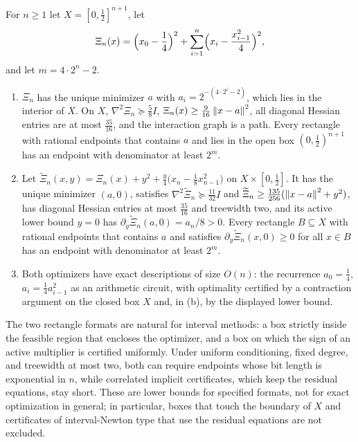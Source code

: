 \begin{proposition}\label{prop:points-rectangle}
For $n\ge1$ let $X=[0,\frac12]^{n+1}$, let
\[
 \Xi_n(x)=\Bigl(x_0-\frac14\Bigr)^2+\sum_{i=1}^n\Bigl(x_i-\frac{x_{i-1}^2}4\Bigr)^2,
\]
and let $m=4\cdot2^n-2$.
\begin{enumerate}[label=(\alph*)]
\item $\Xi_n$ has the unique minimizer $a$ with $a_i=2^{-(4\cdot2^i-2)}$,
which lies in the interior of $X$. On $X$, $\nabla^2\Xi_n\succeq\frac58I$,
$\Xi_n(x)\ge\frac9{16}\left\lVert x-a\right\rVert^2$, all diagonal Hessian entries are at most
$\frac{35}{16}$, and the interaction graph is a path. Every rectangle with
rational endpoints that contains $a$ and lies in the open box
$(0,\frac12)^{n+1}$ has an endpoint with denominator at least $2^m$.
\item Let
$\widetilde\Xi_n(x,y)=\Xi_n(x)+y^2+\frac y4\bigl(x_n-\frac18x_{n-1}^2\bigr)$
on $X\times[0,\frac12]$. It has the unique minimizer $(a,0)$, satisfies
$\nabla^2\widetilde\Xi_n\succeq\frac{11}{32}I$ and
$\widetilde\Xi_n\ge\frac{135}{256}(\left\lVert x-a\right\rVert^2+y^2)$, has diagonal Hessian
entries at most $\frac{35}{16}$ and treewidth two, and its active lower bound
$y=0$ has $\partial_y\widetilde\Xi_n(a,0)=a_n/8>0$. Every rectangle
$B\subseteq X$ with rational endpoints that contains $a$ and satisfies
$\partial_y\widetilde\Xi_n(x,0)\ge0$ for all $x\in B$ has an endpoint with
denominator at least $2^m$.
\item Both optimizers have exact descriptions of size $O(n)$: the
recurrence $a_0=\frac14$, $a_i=\frac14a_{i-1}^2$ as an arithmetic circuit,
with optimality certified by a contraction argument on the closed box $X$
and, in (b), by the displayed lower bound.
\end{enumerate}
\end{proposition}

The two rectangle formats are natural for interval methods: a box strictly
inside the feasible region that encloses the optimizer, and a box on which
the sign of an active multiplier is certified uniformly. Under uniform
conditioning, fixed degree, and treewidth at most two, both can require
endpoints whose bit length is exponential in $n$, while correlated implicit
certificates, which keep the residual equations, stay short. These are lower
bounds for specified formats, not for exact optimization in general; in
particular, boxes that touch the boundary
of $X$ and certificates of interval-Newton type that use the residual
equations are not excluded.

